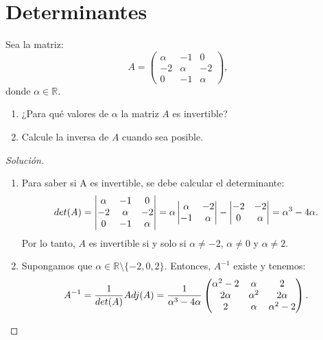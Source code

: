 \documentclass[a4,11pt]{aleph-notas}
\begin{document}
\encabezado

\section{Determinantes}

\begin{ejer}
    Sea la matriz:
    \[
        A= \begin{pmatrix}
            \alpha & -1 & 0 \\
            -2 & \alpha & -2 \\
            0 & -1 & \alpha
        \end{pmatrix},
    \]
    donde $\alpha \in \mathbb{R}$.
    \begin{enumerate}
    \item 
        ¿Para qu\'{e} valores de $\alpha$ la matriz $A$ es invertible? 
    \item 
        Calcule la inversa de $A$ cuando sea posible.
    \end{enumerate}
\end{ejer}

\begin{proof}[Solución]\hspace{0pt}
    \begin{enumerate}
    \item 
    Para saber si A es invertible, se debe calcular el determinante: 
    \[
    det(A)=\begin{vmatrix}
                \alpha & -1 & 0 \\
                -2 & \alpha & -2 \\
                0 & -1 & \alpha
                \end{vmatrix}=\alpha \begin{vmatrix}
                \alpha & -2 \\
                -1 & \alpha
                \end{vmatrix}-\begin{vmatrix}
                -2 & -2 \\
                0 & \alpha
                \end{vmatrix}=\alpha^3-4\alpha.\\
    \]
    Por lo tanto, $A$ es invertible si y solo si $\alpha \neq-2$, $\alpha\neq0$ y $\alpha\neq2$.
    
    \item Supongamos que $\alpha \in \mathbb{R}\setminus\{-2, 0, 2\}$. Entonces, $A^{-1}$ existe y tenemos:
    \[
    A^{-1}=\frac{1}{det(A)}Adj(A)=\frac{1}{\alpha^3-4\alpha}   \begin{pmatrix}
                \alpha^2-2 & \alpha & 2 \\
                2\alpha & \alpha^2 & 2\alpha \\
                2 & \alpha & \alpha^2-2
            \end{pmatrix}.\qedhere
    \]
    \end{enumerate}
\end{proof}
\end{document}
